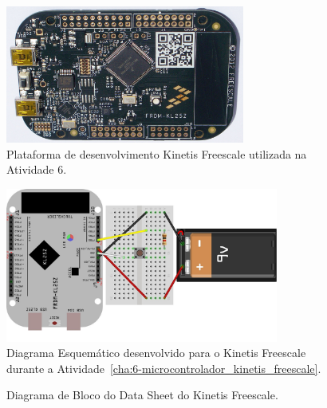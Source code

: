 \documentclass[
	12pt,				%
	openright,			%
  oneside,     %
	a4paper,			%
	english,			%
	french,				%
	spanish,			%
	brazil				%
	]{abntex2}
\begin{document}
\begin{figure}[ht]
  \centering
  \caption{\label{fig:kinetis_freescale}Plataforma de desenvolvimento Kinetis Freescale utilizada na Atividade 6.}
  \includegraphics[width=0.7\textwidth]{images/Atividade06/Freescale_FRDM-KL25Z_board_with_KL25Z128VLK_(ARM_Cortex-M0+_MCU).jpg}
\end{figure}

\begin{figure}[ht]
  \centering
  \caption{\label{fig:cha:6-05Schematic_bb}Diagrama Esquemático desenvolvido para o Kinetis Freescale durante a Atividade~\ref{cha:6-microcontrolador_kinetis_freescale}.}
  \includegraphics[width=0.8\textwidth]{images/Atividade06/05Schematic_bb.jpg}
\end{figure}

\newpage
\begin{figure}[H]
  \centering
  
  \caption{\label{fig:cha-6-diagrama-bloco-freescale}Diagrama de Bloco do Data Sheet do Kinetis Freescale.}
\end{figure}
\end{document}
